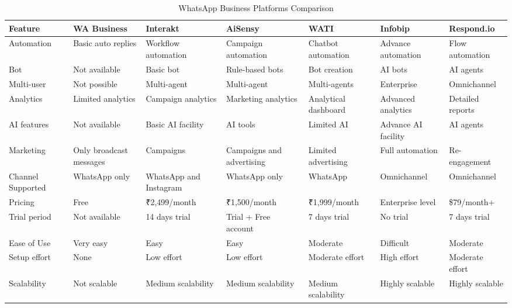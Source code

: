 \begin{table}[htbp]
\centering
\scriptsize
\renewcommand{\arraystretch}{1.3}

\begin{tabularx}{\textwidth}{|p{2.5cm}|X|X|X|X|X|X|}
\hline
\textbf{Feature} & \textbf{WA Business} & \textbf{Interakt} & \textbf{AiSensy} & \textbf{WATI} & \textbf{Infobip} & \textbf{Respond.io} \\
\hline
Automation & Basic auto replies & Workflow automation & Campaign automation & Chatbot automation & Advance automation & Flow automation \\
\hline
Bot & Not available & Basic bot & Rule-based bots & Bot creation & AI bots & AI agents \\
\hline
Multi-user & Not possible & Multi-agent & Multi-agent & Multi-agents & Enterprise & Omnichannel \\
\hline
Analytics & Limited analytics & Campaign analytics & Marketing analytics & Analytical dashboard & Advanced analytics & Detailed reports \\
\hline
AI features & Not available & Basic AI facility & AI tools & Limited AI & Advance AI facility & AI agents \\
\hline
Marketing & Only broadcast messages & Campaigns & Campaigns and advertising & Limited advertising & Full automation & Re-engagement \\
\hline
Channel Supported & WhatsApp only & WhatsApp and Instagram & WhatsApp only & WhatsApp & Omnichannel & Omnichannel \\
\hline
Pricing & Free & ₹2,499/month & ₹1,500/month & ₹1,999/month & Enterprise level & \$79/month+ \\
\hline
Trial period & Not available & 14 days trial & Trial + Free account & 7 days trial & No trial & 7 days trial \\
\hline
Ease of Use & Very easy & Easy & Easy & Moderate & Difficult & Moderate \\
\hline
Setup effort & None & Low effort & Low effort & Moderate effort & High effort & Moderate effort \\
\hline
Scalability & Not scalable & Medium scalability & Medium scalability & Medium scalability & Highly scalable & Highly scalable \\
\hline
\end{tabularx}

\caption{WhatsApp Business Platforms Comparison \cite{whatsapp_difference}}
\end{table}

